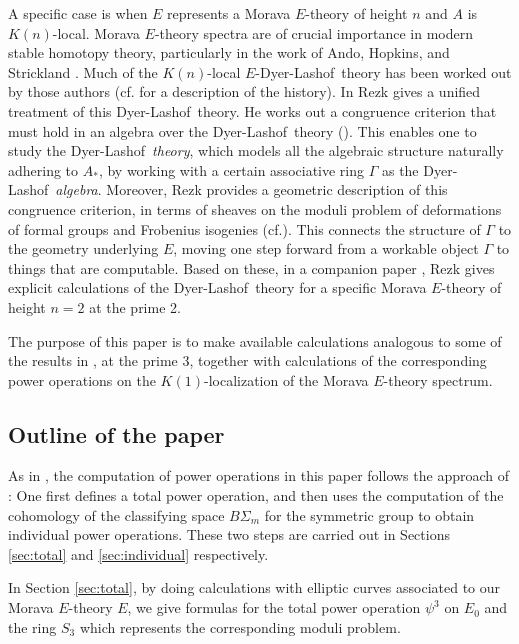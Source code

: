 \documentclass{gtpart}
\theoremstyle{definition}
\theoremstyle{remark}
\newcommand{\cf}{cf.\thinspace}
\newcommand{\DL}{Dyer-Lashof~}
\newcommand{\G}{\Gamma}
\newcommand{\p}{\psi^3}
\begin{document}
A specific case is when $E$ represents a Morava $E$-theory of height $n$ and $A$ is $K(n)$-local.  
Morava $E$-theory spectra are of crucial importance in modern stable homotopy theory, 
particularly in the work of Ando, Hopkins, and Strickland \cite{cube}.  
Much of the $K(n)$-local $E$-\DL theory has been worked out by those authors (\cf \cite[1.5]{cong} for a description of the history).  
In \cite{cong} Rezk gives a unified treatment of this \DL theory.  
He works out a congruence criterion that must hold in an algebra over the \DL theory (\cite[Theorem A]{cong}).  
This enables one to study the \DL {\em theory}, which models all the algebraic structure naturally adhering to $A_*$, 
by working with a certain associative ring $\G$ as the \DL {\em algebra}.  
Moreover, Rezk provides a geometric description of this congruence criterion, 
in terms of sheaves on the moduli problem of deformations of formal groups and Frobenius isogenies (\cf \cite[Theorem B]{cong}).  
This connects the structure of $\G$ to the geometry underlying $E$, 
moving one step forward from a workable object $\G$ to things that are computable.  
Based on these, in a companion paper \cite{h2p2}, 
Rezk gives explicit calculations of the \DL theory for a specific Morava $E$-theory of height $n = 2$ at the prime 2.  

The purpose of this paper is to make available calculations analogous to some of the results in \cite{h2p2}, at the prime 3, 
together with calculations of the corresponding power operations on the $K(1)$-localization of the Morava $E$-theory spectrum.  


\subsection{Outline of the paper}

As in \cite{h2p2}, the computation of power operations in this paper follows the approach of \cite{steenrod}: 
One first defines a total power operation, 
and then uses the computation of the cohomology of the classifying space $B\Sigma_m$ for the symmetric group to obtain individual power operations.  
These two steps are carried out in Sections \ref{sec:total} and \ref{sec:individual} respectively.  

In Section \ref{sec:total}, by doing calculations with elliptic curves associated to our Morava $E$-theory $E$, 
we give formulas for the total power operation $\p$ on $E_0$ and the ring $S_3$ which represents the corresponding moduli problem.  
\end{document}

